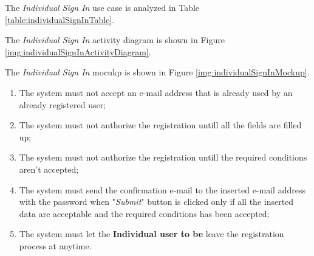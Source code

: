 The \textit{Individual Sign In} use case is analyzed in Table \ref{table:individualSignInTable}.

The \textit{Individual Sign In} activity diagram is shown in Figure \ref{img:individualSignInActivityDiagram}.

The \textit{Individual Sign In} mocukp is shown in Figure \ref{img:individualSignInMockup}.

\begin{enumerate}
  \item The system must not accept an e-mail address that is already used by an already registered user;
  \item The system must not authorize the registration untill all the fields are filled up;
  \item The system must not authorize the registration untill the required conditions aren't accepted;
  \item The system must send the confirmation e-mail to the inserted e-mail address with the password when "\textit{Submit}" button is clicked only if all the inserted data are acceptable and the required conditions has been accepted;
  \item The system must let the \textbf{Individual user to be} leave the registration process at anytime.
\end{enumerate}

